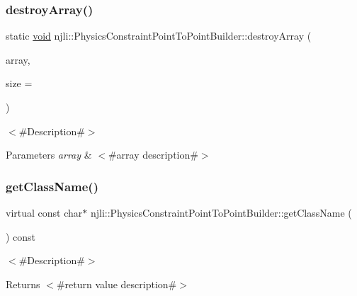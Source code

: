 \subsubsection{\texorpdfstring{destroy\+Array()}{destroyArray()}}
{\footnotesize\ttfamily static \mbox{\hyperlink{_thread_8h_af1e856da2e658414cb2456cb6f7ebc66}{void}} njli\+::\+Physics\+Constraint\+Point\+To\+Point\+Builder\+::destroy\+Array (\begin{DoxyParamCaption}\item[{\mbox{\hyperlink{classnjli_1_1_physics_constraint_point_to_point_builder}{Physics\+Constraint\+Point\+To\+Point\+Builder}} $\ast$$\ast$}]{array,  }\item[{const \mbox{\hyperlink{_util_8h_a10e94b422ef0c20dcdec20d31a1f5049}{u32}}}]{size = {} }\end{DoxyParamCaption})\hspace{0.3cm}{\ttfamily [static]}}

$<$\#\+Description\#$>$


\begin{DoxyParams}{Parameters}
{\em array} & $<$\#array description\#$>$ \\
\hline
\end{DoxyParams}
\mbox{\label{classnjli_1_1_physics_constraint_point_to_point_builder_acd35a9a7018977edc47c49ef7eb82272}} 
\subsubsection{\texorpdfstring{get\+Class\+Name()}{getClassName()}}
{\footnotesize\ttfamily virtual const char$\ast$ njli\+::\+Physics\+Constraint\+Point\+To\+Point\+Builder\+::get\+Class\+Name (\begin{DoxyParamCaption}{ }\end{DoxyParamCaption}) const\hspace{0.3cm}{\ttfamily [virtual]}}

$<$\#\+Description\#$>$

\begin{DoxyReturn}{Returns}
$<$\#return value description\#$>$ 
\end{DoxyReturn}


